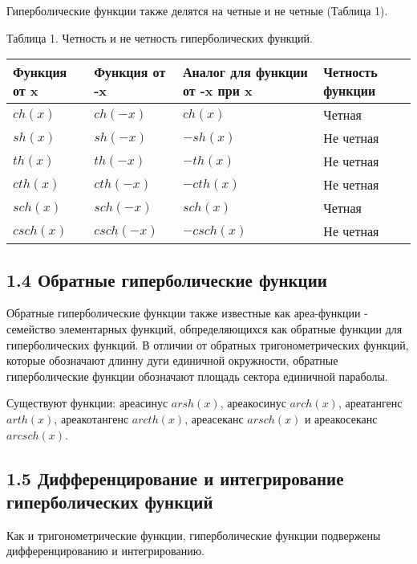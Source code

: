 Гиперболические функции также делятся на четные и не четные (Таблица 1).

Таблица 1. Четность и не четность гиперболических функций.
\begin{center}
\begin{tabular}{| p{3cm} | p{3cm} | p{3cm} | p{3cm} |}
    \hline
    Функция от x & Функция от -x & Аналог для функции от -x при x & Четность функции \\ \hline
    $ch(x)$ & $ch(-x)$ & $ch(x)$ & Четная  \\ \hline
    $sh(x)$ & $sh(-x)$ & $-sh(x)$ & Не четная \\\hline
    $th(x)$ & $th(-x)$ & $-th(x)$ &  Не четная  \\ \hline
    $cth(x)$ & $cth(-x)$ & $-cth(x)$ &  Не четная \\ \hline
    $sch(x)$ & $sch(-x)$ & $sch(x)$ & Четная \\ \hline
    $csch(x)$ & $csch(-x)$ & $-csch(x)$ &  Не четная \\ \hline
    \hline
\end{tabular}
\end{center}


\subsection*{1.4 Обратные гиперболические функции}

Обратные гиперболические функции также известные как ареа-функции - семейство элементарных функций, обпределяющихся как обратные функции для гиперболических функций. В отличии от обратных тригонометрических функций, которые обозначают длинну дуги единичной окружности, обратные гиперболические функции обозначают площадь сектора единичной параболы.

Существуют функции: ареасинус $arsh(x)$, ареакосинус $arch(x)$, ареатангенс $arth(x)$, ареакотангенс $arcth(x)$, ареасеканс $arsch(x)$ и ареакосеканс $arcsch(x)$.

\subsection*{1.5 Дифференцирование и интегрирование гиперболических функций}
Как и тригонометрические функции, гиперболические функции подвержены дифференцированию и интегрированию.

